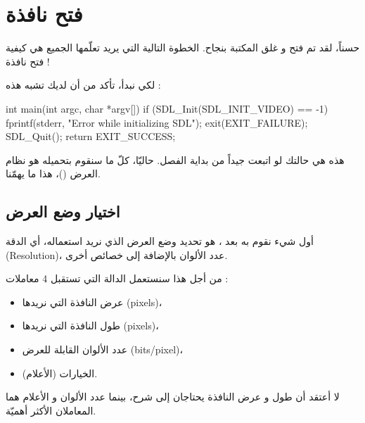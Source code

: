 \section{فتح نافذة}

حسناً، لقد تم فتح و غلق المكتبة بنجاح. الخطوة التالية التي يريد تعلّمها الجميع هي كيفية فتح نافذة ! 

لكي نبدأ، تأكد من أن لديك
تشبه هذه :

\begin{Csource}
int main(int argc, char *argv[])
{
	if (SDL_Init(SDL_INIT_VIDEO) == -1)
	{
		fprintf(stderr, "Error while initializing SDL");
		exit(EXIT_FAILURE);
	}
	SDL_Quit();
	return EXIT_SUCCESS;
}
\end{Csource}

هذه هي حالتك لو اتبعت جيداً من بداية الفصل. حاليّا، كلّ ما سنقوم بتحميله هو نظام العرض
()،
هذا ما يهمّنا.
\subsection{اختيار وضع العرض}

أول شيء نقوم به بعد 
،
هو تحديد وضع العرض الذي نريد استعماله، أي الدقة
(\textenglish{Resolution})،
عدد الألوان بالإضافة إلى خصائص أخرى.

من أجل هذا سنستعمل الدالة
التي تستقبل 4 معاملات :

\begin{itemize}
	\item عرض النافذة التي نريدها
	(\textenglish{pixels})،
	\item طول النافذة التي نريدها
	(\textenglish{pixels})،
	\item عدد الألوان القابلة للعرض
	(\textenglish{bits/pixel})،
	\item الخيارات (الأعلام).
\end{itemize}

لا أعتقد أن طول و عرض النافذة يحتاجان إلى شرح، بينما عدد الألوان و الأعلام هما المعاملان الأكثر أهميّة.

